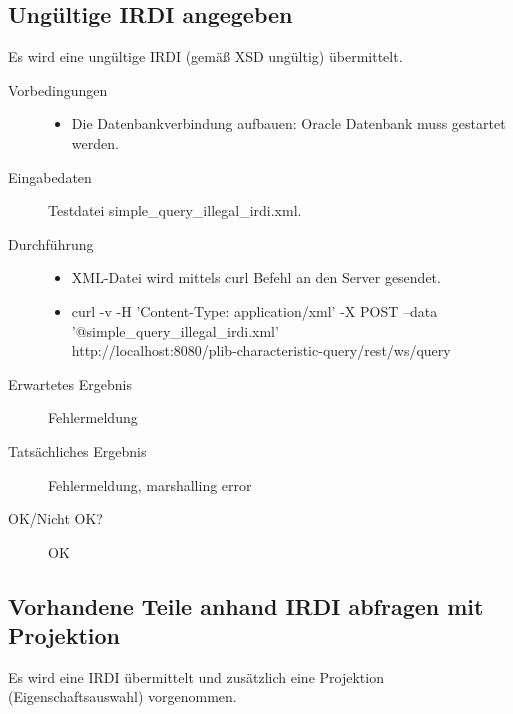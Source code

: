 \subsection{Ungültige IRDI angegeben}

Es wird eine ungültige IRDI (gemäß XSD ungültig) übermittelt. 

\begin{description}
\item[Vorbedingungen] 
  \begin{itemize}
   \item Die Datenbankverbindung aufbauen: Oracle Datenbank muss gestartet werden.
  \end{itemize}
\item[Eingabedaten] Testdatei simple\_query\_illegal\_irdi.xml. 
\item[Durchführung]
   \begin{itemize}
   \item XML-Datei wird mittels curl Befehl an den Server gesendet.
   \item curl -v -H 'Content-Type: application/xml' -X POST --data \\ 
   '@simple\_query\_illegal\_irdi.xml' \\
   http://localhost:8080/plib-characteristic-query/rest/ws/query
  \end{itemize}
\item[Erwartetes Ergebnis] Fehlermeldung
\item[Tatsächliches Ergebnis] Fehlermeldung, marshalling error
\item[OK/Nicht OK?] OK
\end{description}

\subsection{Vorhandene Teile anhand IRDI abfragen mit Projektion}

Es wird eine IRDI übermittelt und zusätzlich eine Projektion (Eigenschaftsauswahl) vorgenommen.

